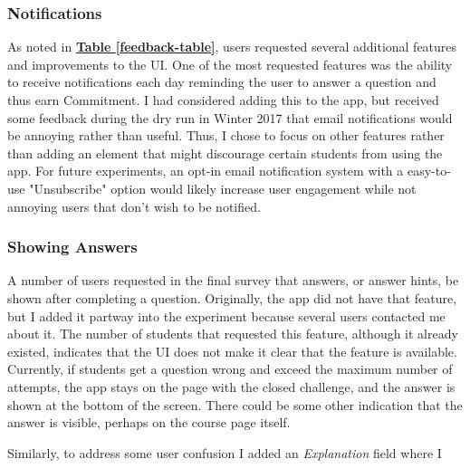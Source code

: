 \subsubsection{Notifications}

\par As noted in \textbf{\hyperref[feedback-table]{Table \ref*{feedback-table}}}, users requested several additional features and improvements to the UI. One of the most requested features was the ability to receive notifications each day reminding the user to answer a question and thus earn Commitment. I had considered adding this to the app, but received some feedback during the dry run in Winter 2017 that email notifications would be annoying rather than useful. Thus, I chose to focus on other features rather than adding an element that might discourage certain students from using the app. For future experiments, an opt-in email notification system with a easy-to-use "Unsubscribe" option would likely increase user engagement while not annoying users that don't wish to be notified.

\subsubsection{Showing Answers}

\par A number of users requested in the final survey that answers, or answer hints, be shown after completing a question. Originally, the app did not have that feature, but I added it partway into the experiment because several users contacted me about it. The number of students that requested this feature, although it already existed, indicates that the UI does not make it clear that the feature is available. Currently, if students get a question wrong and exceed the maximum number of attempts, the app stays on the page with the closed challenge, and the answer is shown at the bottom of the screen. There could be some other indication that the answer is visible, perhaps on the course page itself.

\par Similarly, to address some user confusion I added an \textit{Explanation} field where I 
